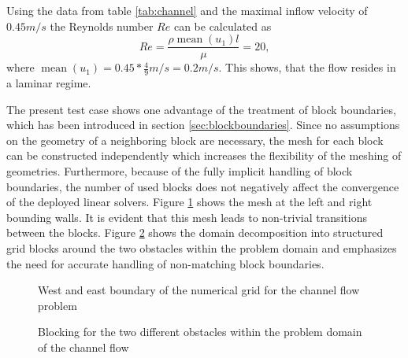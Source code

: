 Using the data from table \ref{tab:channel} and the maximal inflow velocity of $0.45m/s$ the Reynolds number \(Re\) can be calculated as
\begin{displaymath}
  Re = \frac{\rho \operatorname{mean}(u_1) l}{\mu} = 20,
\end{displaymath}
where \(\operatorname{mean}(u_1) = 0.45*\frac{4}{9} m/s = 0.2 m/s\). This shows, that the flow resides in a laminar regime.

The present test case shows one advantage of the treatment of block boundaries, which has been introduced in section \ref{sec:blockboundaries}. Since no assumptions on the geometry of a neighboring block are necessary, the mesh for each block can be constructed independently which increases the flexibility of the meshing of geometries. Furthermore, because of the fully implicit handling of block boundaries, the number of used blocks does not negatively affect the convergence of the deployed linear solvers. Figure \ref{fig:channel1} shows the mesh at the left and right bounding walls. It is evident that this mesh leads to non-trivial transitions between the blocks. Figure \ref{fig:blocking} shows the domain decomposition into structured grid blocks around the two obstacles within the problem domain and emphasizes the need for accurate handling of non-matching block boundaries.

\begin{figure}
  \centering
  
  \caption{West and east boundary of the numerical grid for the channel flow problem}
  \label{fig:channel1}
\end{figure}

%  

\begin{figure}
   \centering
    \hfill
    \caption{Blocking for the two different obstacles within the problem domain of the channel flow}
    \label{fig:blocking}
\end{figure}

